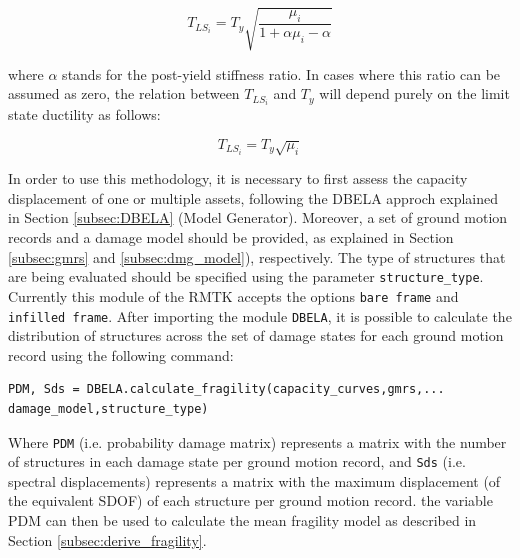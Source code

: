 \begin{equation}
T_{LS_i} = T_y\sqrt{\frac{\mu_{i}}{1+\alpha\mu_{i}-\alpha}}
\end{equation}

where $\alpha$ stands for the post-yield stiffness ratio. In cases where this ratio can be assumed as zero, the relation between $T_{LS_i}$ and $T_y$ will depend purely on the limit state ductility as follows:

\begin{equation}
T_{LS_i} = T_y\sqrt{\mu_{i}}
\end{equation}

In order to use this methodology, it is necessary to first assess the capacity displacement of one or multiple assets, following the DBELA approch explained in Section \ref{subsec:DBELA} (Model Generator). Moreover, a set of ground motion records and a damage model should be provided, as explained in Section \ref{subsec:gmrs} and \ref{subsec:dmg_model}), respectively. The type of structures that are being evaluated should be specified using the parameter \verb=structure_type=. Currently this module of the RMTK accepts the options \verb=bare frame= and \verb=infilled frame=. After importing the module \verb=DBELA=, it is possible to calculate the distribution of structures across the set of damage states for each ground motion record using the following command:

\begin{Verbatim}[frame=single, commandchars=\\\{\}, samepage=true]
PDM, Sds = DBELA.calculate_fragility(capacity_curves,gmrs,...
damage_model,structure_type)
\end{Verbatim}

Where \verb=PDM= (i.e. probability damage matrix) represents a matrix with the number of structures in each damage state per ground motion record, and \verb=Sds= (i.e. spectral displacements) represents a matrix with the maximum displacement (of the equivalent SDOF) of each structure per ground motion record. the variable PDM can then be used to calculate the mean fragility model as described in Section \ref{subsec:derive_fragility}.
